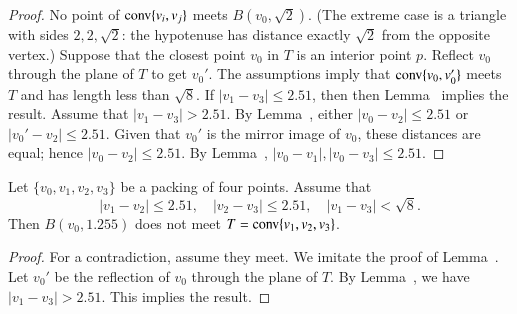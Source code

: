 \begin{tarskidata}
\begin{tarski}
\begin{proof}
No point of ${\operatorname{conv}}\{v_i,v_j\}$ meets $B(v_0,\sqrt2)$.  (The
extreme case is a triangle with sides $2,2,\sqrt2$: the hypotenuse
has distance exactly $\sqrt2$ from the opposite vertex.)
Suppose that the closest point $v_0$ in
$T$ is an interior point $p$. Reflect $v_0$
through the plane of $T$ to get $v_0'$. The assumptions imply
that ${\operatorname{conv}}\{v_0,v_0'\}$ meets $T$ and has
length less than $\sqrt8$. If $|v_1-v_3|\le2.51$, then
then Lemma~ implies the result.
Assume that $|v_1-v_3|>2.51$.
By Lemma~,  
either $|v_0-v_2|\le2.51$ or $|v_0'-v_2|\le 2.51$.  Given that
$v_0'$ is the mirror image of $v_0$, these distances are equal;
hence $|v_0-v_2|\le 2.51$.  By Lemma~,
$|v_0-v_1|,|v_0-v_3|\le 2.51$.
\end{proof}
\end{tarski}


\begin{tarski}

\begin{lemma}
Let $\{v_0,v_1,v_2,v_3\}$ be a packing of four points. Assume that
$$
   |v_1-v_2|\le 2.51,\quad |v_2-v_3|\le 2.51,\quad |v_1-v_3|<\sqrt8.
$$
Then $B(v_0,1.255)$ does not meet $T={\operatorname{conv}}\{v_1,v_2,v_3\}$.
\end{lemma}


\begin{proof}   For a contradiction, assume they meet. 
We imitate the proof of Lemma~.
Let $v_0'$ be the reflection of $v_0$ through the plane of $T$.
By
Lemma~, we have $|v_1-v_3|>2.51$.
This implies the result.
\end{proof}
\end{tarski}














\end{tarskidata}
